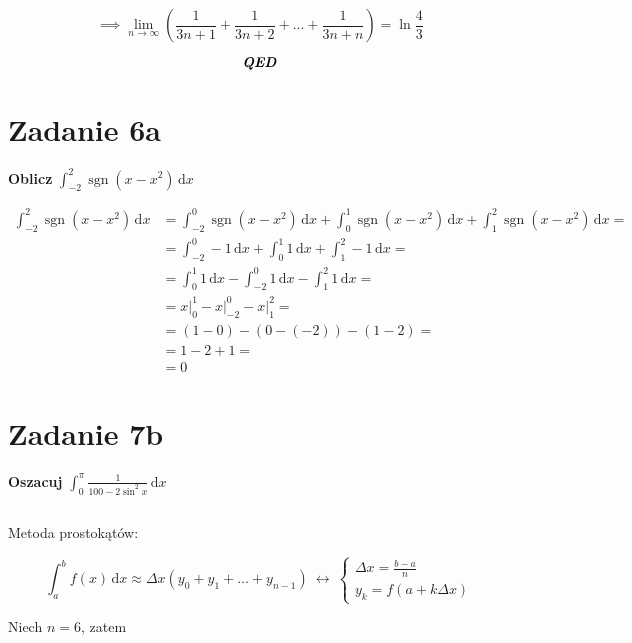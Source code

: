 \documentclass[12pt]{article}
\newcommand{\for}{\ \leftrightarrow\ }
\newcommand{\Integral}[4]{\int_{#1}^{#2} \! #3 \, \mathrm{d}#4}
\newcommand{\qed}{\textbf{\textit{QED}}}
\newcommand{\task}[1]{\textbf{ #1}}
\DeclareMathOperator{\?}{?}
\DeclareMathOperator{\sgn}{sgn}
\begin{document}
\begin{equation*}
    \implies
    \lim_{n \to \infty} \left( \frac{1}{3n+1} + \frac{1}{3n+2} + ... + \frac{1}{3n + n} \right) =
    \ln{\frac{4}{3}}
\end{equation*}

\[ \qed \]

\section{Zadanie 6a}
\task{Oblicz } $ \displaystyle \Integral{-2}{2}{\sgn(x-x^2)}{x} $

\begin{align*}
    \displaystyle \Integral{-2}{2}{\sgn(x-x^2)}{x} &=
    \Integral{-2}{0}{\sgn(x-x^2)}{x} + \Integral{0}{1}{\sgn(x-x^2)}{x} + \Integral{1}{2}{\sgn(x-x^2)}{x} =\\
    &= \Integral{-2}{0}{-1}{x} + \Integral{0}{1}{1}{x} + \Integral{1}{2}{-1}{x} =\\
    &= \Integral{0}{1}{1}{x} - \Integral{-2}{0}{1}{x} - \Integral{1}{2}{1}{x} =\\
    &= \left. x\right|_0^1 - \left. x\right|_{-2}^0 - \left. x\right|_1^2 =\\
    &= (1 - 0) - (0 - (-2)) - (1 - 2) =\\
    &= 1 - 2 + 1 =\\
    &= 0
\end{align*}

\section{Zadanie 7b}
\task{Oszacuj } $ \displaystyle \Integral{0}{\pi}{\frac{1}{100 - 2 \sin^2{x}}}{x} $

$ $

Metoda prostokątów:

\begin{equation*}
    \Integral{a}{b}{f(x)}{x} \approx \Delta x (y_0 + y_1 + ... + y_{n-1})
    \for
    \left\{ \begin{array}{l}
        \displaystyle \Delta x = \frac{b - a}{n} \\[0.5em]
        y_k = f(a + k \Delta x)
    \end{array} \right.
\end{equation*}

Niech $n = 6$, zatem
\end{document}

